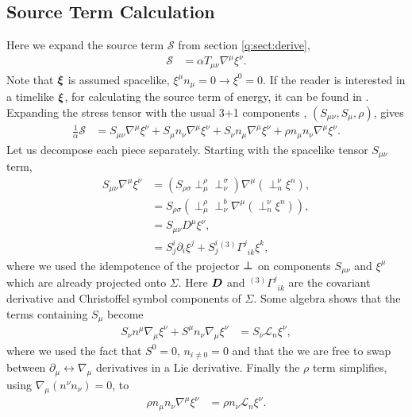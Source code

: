 \subsection{Source Term Calculation} \label{q:sect:source}
Here we expand the source term $\mathcal{S}$ from section \ref{q:sect:derive},
\begin{align}
\mathcal{S} &= \alpha T_{\mu\nu} \nabla^\mu \xi^\nu.
\end{align}
Note that $\boldsymbol{\xi}$ is assumed spacelike, $\xi^\mu n_\mu = 0\rightarrow \xi^0=0$. If the reader is interested in a timelike $\boldsymbol{\xi}$, for calculating the source term of energy, it can be found in \cite{Clough_2021}. Expanding the stress tensor with the usual 3+1 components \cite{gourgoulhon20073+}, \cite{alcubierre2008introduction} $(S_{\mu\nu}, S_{\mu}, \rho)$, gives
\begin{align}
\frac{1}{\alpha}\mathcal{S} &= S_{\mu\nu}\nabla^\mu \xi^\nu + S_\mu n_\nu \nabla^\mu \xi^\nu + S_\nu n_\mu \nabla^\mu \xi^\nu + \rho n_\mu n_\nu\nabla^\mu \xi^\nu.
\end{align}
Let us decompose each piece separately. Starting with the spacelike tensor $S_{\mu\nu}$ term,
\begin{align}
S_{\mu\nu}\nabla^\mu \xi^\nu &= (S_{\rho \sigma}\perp^\rho _\mu \perp^\sigma_\nu )\nabla^\mu ( \perp^\nu_n \xi^n ),  \\
&= S_{\rho \sigma}(\perp^\rho _\mu \perp^b_\nu \nabla^\mu ( \perp^\nu_n \xi^n )),  \\
&= S_{\mu\nu} D^\mu \xi^\nu, \\
&= S^i_{j}\partial_i \xi^j + S^i_{j} {}^{(3)}\Gamma^j_{\,\,\,i k} \xi^k,
\label{q:eq:S1}
\end{align}
where we used the idempotence of the projector $\boldsymbol{\perp}$ on components $S_{\mu\nu}$ and $\xi^\mu$ which are already projected onto $\Sigma$. Here $\boldsymbol{D}$ and ${}^{(3)}\Gamma^j_{\,\,\,i k}$ are the covariant derivative and Christoffel symbol components of $\Sigma$. Some algebra shows that the terms containing $S_\mu$ become
\begin{align}
\label{q:eq:S2}S_\nu n^\mu \nabla_\mu \xi^\nu + S^\mu n_\nu \nabla_\mu \xi^\nu  &= S_\nu \mathcal{L}_n \xi^\nu,
\end{align}
where we used the fact that $S^0 = 0$, $n_{i\neq0}=0$ and that the we are free to swap between $\partial_\mu \leftrightarrow \nabla_\mu$ derivatives in a Lie derivative. Finally the $\rho$ term simplifies, using $\nabla_\mu (n^\nu n_\nu) = 0$, to
\begin{align} \label{q:eq:S3}
\rho n_\mu n_\nu\nabla^\mu \xi^\nu &= \rho n_\nu \mathcal{L}_n \xi^\nu.
\end{align}
